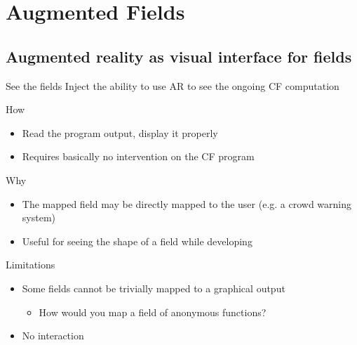 \documentclass[presentation]{beamer} %
\begin{document}
\section{Augmented Fields}
\subsection{Augmented reality as visual interface for fields}
\begin{frame}{See the fields}
  Inject the ability to use AR to see the ongoing CF computation
  \begin{block} {How}
   \begin{itemize}
    \item Read the program output, display it properly
    \item Requires basically no intervention on the CF program
   \end{itemize}
  \end{block}
  \begin{block} {Why}
   \begin{itemize}
    \item The mapped field may be directly mapped to the user (e.g. a crowd warning system)
    \item Useful for seeing the shape of a field while developing
   \end{itemize}
  \end{block}
  \begin{block} {Limitations}
   \begin{itemize}
    \item Some fields cannot be trivially mapped to a graphical output
    \begin{itemize}
      \item How would you map a field of anonymous functions?
    \end{itemize}
    \item No interaction
   \end{itemize}
  \end{block}
\end{frame}
\end{document}
